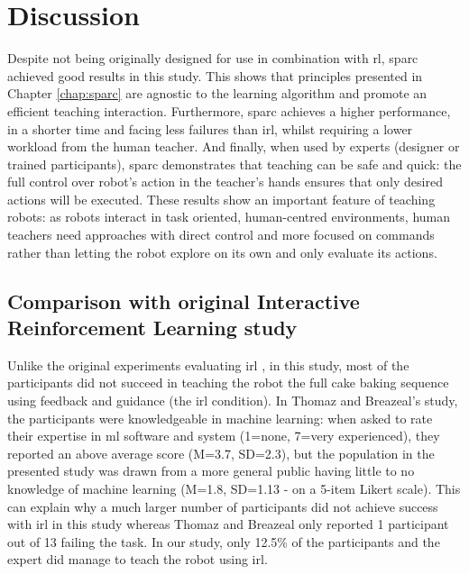 \section{Discussion}
\label{sec:control_discussion}

Despite not being originally designed for use in combination with \acrlong{rl}, \gls{sparc} achieved good results in this study. This shows that principles presented in Chapter \ref{chap:sparc} are agnostic to the learning algorithm and promote an efficient teaching interaction. Furthermore, \gls{sparc} achieves a higher performance, in a shorter time and facing less failures than \gls{irl}, whilst requiring a lower workload from the human teacher. And finally, when used by experts (designer or trained participants), \gls{sparc} demonstrates that teaching can be safe and quick: the full control over robot's action in the teacher's hands ensures that only desired actions will be executed. These results show an important feature of teaching robots: as robots interact in task oriented, human-centred environments, human teachers need approaches with direct control and more focused on commands rather than letting the robot explore on its own and only evaluate its actions.

\subsection{Comparison with original Interactive Reinforcement Learning study}


Unlike the original experiments evaluating \gls{irl} \citep{thomaz2008teachable}, in this study, most of the participants did not succeed in teaching the robot the full cake baking sequence using feedback and guidance (the \gls{irl} condition). In Thomaz and Breazeal's study, the participants were knowledgeable in machine learning: when asked to rate their expertise in \gls{ml} software and system (1=none, 7=very experienced), they reported an above average score (M=3.7, SD=2.3), but the population in the presented study was drawn from a more general public having little to no knowledge of machine learning (M=1.8, SD=1.13 - on a 5-item Likert scale). This can explain why a much larger number of participants did not achieve success with \gls{irl} in this study whereas Thomaz and Breazeal only reported 1 participant out of 13 failing the task. In our study, only 12.5\% of the participants and the expert did manage to teach the robot using \gls{irl}. 

